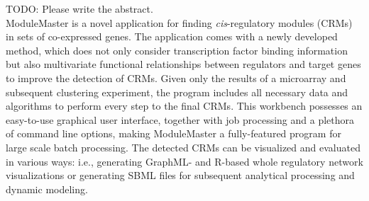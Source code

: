 %
%
TODO: Please write the abstract.\\
ModuleMaster is a novel application for finding \emph{cis}-regulatory modules (CRMs) in sets of co-expressed genes. The application comes with a newly developed method, which does not only consider transcription factor binding information but also multivariate functional relationships between regulators and target genes to improve the detection of CRMs. Given only the results of a microarray and subsequent clustering experiment, the program includes all necessary data and algorithms to perform every step to the final CRMs. This workbench possesses an easy-to-use graphical user interface, together with job processing and a plethora of command line options, making ModuleMaster a fully-featured program for large scale batch processing. The detected CRMs can be visualized and evaluated in various ways: i.e., generating GraphML- and R-based whole regulatory network visualizations or generating SBML files for subsequent analytical processing and dynamic modeling. 